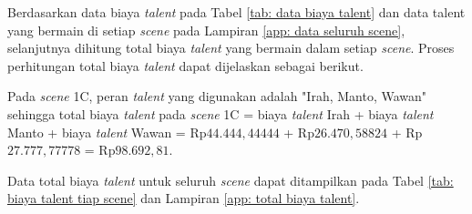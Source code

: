 {{Berdasarkan data biaya \textit{talent} pada Tabel \ref{tab: data biaya talent} dan data talent yang bermain di setiap \textit{scene} pada Lampiran \ref{app: data seluruh scene},
selanjutnya dihitung total biaya \textit{talent} yang bermain dalam setiap \textit{scene}.
Proses perhitungan total biaya \textit{talent} dapat dijelaskan sebagai berikut.

\noindent
Pada \textit{scene} 1C, peran \textit{talent} yang digunakan adalah "Irah, Manto, Wawan" sehingga total biaya \textit{talent}
pada \textit{scene} 1C = biaya \textit{talent} Irah + biaya \textit{talent} Manto + biaya \textit{talent} Wawan = Rp$44.444,44444$ + Rp$26.470,58824 $ + Rp$27.777,77778$ = Rp$98.692,81$.

\noindent
Data total biaya \textit{talent} untuk seluruh \textit{scene} dapat ditampilkan pada Tabel \ref{tab: biaya talent tiap scene} dan Lampiran \ref{app: total biaya talent}.

\begin{tabularx}{\textwidth}{|c|l|>{\centering\arraybackslash}p{2.3cm}|}
    \caption{Data Total Biaya \textit{Talent} tiap \textit{Scene}}
    \label{tab: biaya talent tiap scene}                                                                                                                     \\


\end{tabularx}}}

